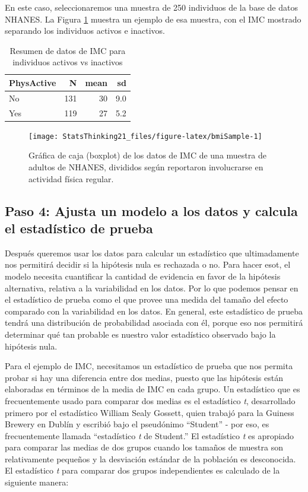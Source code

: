 \documentclass[
  12pt,
]{book}
\theoremstyle{definition}
\theoremstyle{definition}
\theoremstyle{definition}
\theoremstyle{remark}
\begin{document}
En este caso, seleccionaremos una muestra de 250 individuos de la base de datos NHANES. La Figura \ref{fig:bmiSample} muestra un ejemplo de esa muestra, con el IMC mostrado separando los individuos activos e inactivos.

\begin{table}

\caption{\label{tab:unnamed-chunk-39}Resumen de datos de IMC para individuos activos vs inactivos}
\centering
\begin{tabular}[t]{l|r|r|r}
\hline
PhysActive & N & mean & sd\\
\hline
No & 131 & 30 & 9.0\\
\hline
Yes & 119 & 27 & 5.2\\
\hline
\end{tabular}
\end{table}

\begin{figure}
\texttt{[image: StatsThinking21\_files/figure-latex/bmiSample-1]} \caption{Gráfica de caja (boxplot) de los datos de IMC de una muestra de adultos de NHANES, divididos según reportaron involucrarse en actividad física regular.}\label{fig:bmiSample}
\end{figure}

\hypertarget{paso-4-ajusta-un-modelo-a-los-datos-y-calcula-el-estaduxedstico-de-prueba}{%
\subsection{Paso 4: Ajusta un modelo a los datos y calcula el estadístico de prueba}\label{paso-4-ajusta-un-modelo-a-los-datos-y-calcula-el-estaduxedstico-de-prueba}}

Después queremos usar los datos para calcular un estadístico que ultimadamente nos permitirá decidir si la hipótesis nula es rechazada o no. Para hacer esot, el modelo necesita cuantificar la cantidad de evidencia en favor de la hipótesis alternativa, relativa a la variabilidad en los datos. Por lo que podemos pensar en el estadístico de prueba como el que provee una medida del tamaño del efecto comparado con la variabilidad en los datos. En general, este estadístico de prueba tendrá una distribución de probabilidad asociada con él, porque eso nos permitirá determinar qué tan probable es nuestro valor estadístico observado bajo la hipótesis nula.

Para el ejemplo de IMC, necesitamos un estadístico de prueba que nos permita probar si hay una diferencia entre dos medias, puesto que las hipótesis están elaboradas en términos de la media de IMC en cada grupo. Un estadístico que es frecuentemente usado para comparar dos medias es el estadístico \emph{t}, desarrollado primero por el estadístico William Sealy Gossett, quien trabajó para la Guiness Brewery en Dublín y escribió bajo el pseudónimo ``Student'' - por eso, es frecuentemente llamada ``estadístico \emph{t} de Student.'' El estadístico \emph{t} es apropiado para comparar las medias de dos grupos cuando los tamaños de muestra son relativamente pequeños y la desviación estándar de la población es desconocida. El estadístico \emph{t} para comparar dos grupos independientes es calculado de la siguiente manera:
\end{document}
